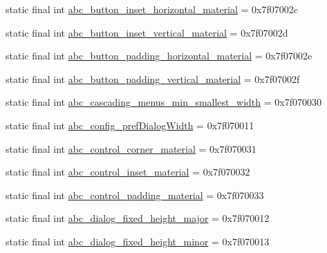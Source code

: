\begin{CompactItemize}
\item 
static final int \hyperlink{classandroid_1_1support_1_1graphics_1_1drawable_1_1animated_1_1_r_1_1dimen_92e46a1904fade1d7d7df4123e4066db}{abc\_\-button\_\-inset\_\-horizontal\_\-material} = 0x7f07002c
\item 
static final int \hyperlink{classandroid_1_1support_1_1graphics_1_1drawable_1_1animated_1_1_r_1_1dimen_44b6c0380074f7609cc6f2e98fc8b590}{abc\_\-button\_\-inset\_\-vertical\_\-material} = 0x7f07002d
\item 
static final int \hyperlink{classandroid_1_1support_1_1graphics_1_1drawable_1_1animated_1_1_r_1_1dimen_5dfdf219a2b0930c5c232a8ec2eefc26}{abc\_\-button\_\-padding\_\-horizontal\_\-material} = 0x7f07002e
\item 
static final int \hyperlink{classandroid_1_1support_1_1graphics_1_1drawable_1_1animated_1_1_r_1_1dimen_5afed5ae81841fb7b6f607a6160a0506}{abc\_\-button\_\-padding\_\-vertical\_\-material} = 0x7f07002f
\item 
static final int \hyperlink{classandroid_1_1support_1_1graphics_1_1drawable_1_1animated_1_1_r_1_1dimen_c3790d5cc533d09b4a75e6ad2758493c}{abc\_\-cascading\_\-menus\_\-min\_\-smallest\_\-width} = 0x7f070030
\item 
static final int \hyperlink{classandroid_1_1support_1_1graphics_1_1drawable_1_1animated_1_1_r_1_1dimen_a8c2ba423d251f740d7758a378fbd84a}{abc\_\-config\_\-prefDialogWidth} = 0x7f070011
\item 
static final int \hyperlink{classandroid_1_1support_1_1graphics_1_1drawable_1_1animated_1_1_r_1_1dimen_30570905764860722d265220f1e60261}{abc\_\-control\_\-corner\_\-material} = 0x7f070031
\item 
static final int \hyperlink{classandroid_1_1support_1_1graphics_1_1drawable_1_1animated_1_1_r_1_1dimen_e18335f74eff0bff4370254c56c54720}{abc\_\-control\_\-inset\_\-material} = 0x7f070032
\item 
static final int \hyperlink{classandroid_1_1support_1_1graphics_1_1drawable_1_1animated_1_1_r_1_1dimen_99b6c04a4a922c1ba88d98ea7bf89c2b}{abc\_\-control\_\-padding\_\-material} = 0x7f070033
\item 
static final int \hyperlink{classandroid_1_1support_1_1graphics_1_1drawable_1_1animated_1_1_r_1_1dimen_50d0556a06a6a1dcfde216cc5147cb31}{abc\_\-dialog\_\-fixed\_\-height\_\-major} = 0x7f070012
\item 
static final int \hyperlink{classandroid_1_1support_1_1graphics_1_1drawable_1_1animated_1_1_r_1_1dimen_0fa9e677b70a68dee43c4499d4a238fd}{abc\_\-dialog\_\-fixed\_\-height\_\-minor} = 0x7f070013

\end{CompactItemize}

